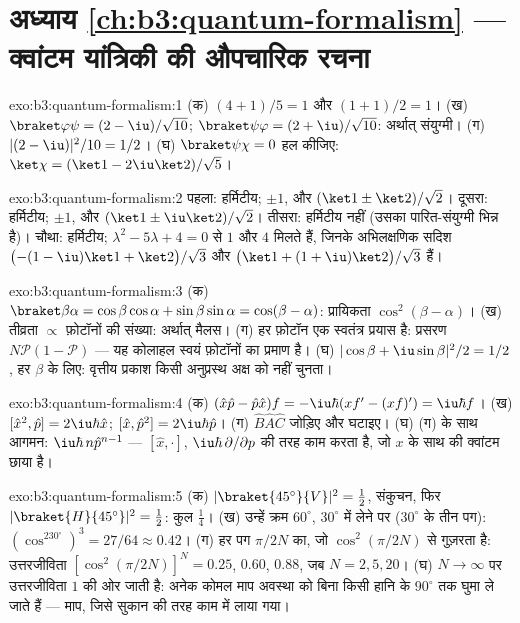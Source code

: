 \section*{अध्याय \ref{ch:b3:quantum-formalism} --- क्वांटम यांत्रिकी की औपचारिक रचना}

\begin{solution}{exo:b3:quantum-formalism:1}
(क) $(4 + 1)/5 = 1$ और $(1 + 1)/2 = 1$। (ख) $\braket\varphi\psi =
(2 - \iu)/\sqrt{10}$; $\braket\psi\varphi = (2 + \iu)/\sqrt{10}$:
अर्थात् संयुग्मी। (ग) $|(2 - \iu)|^2/10 = 1/2$। (घ)
$\braket\psi\chi = 0$ हल कीजिए: $\ket\chi = (\ket1 - 2\iu\ket2)/\sqrt5$।
\end{solution}

\begin{solution}{exo:b3:quantum-formalism:2}
पहला: हर्मिटीय; $\pm1$, और $(\ket1 \pm \ket2)/\sqrt2$। दूसरा:
हर्मिटीय; $\pm1$, और $(\ket1 \pm \iu\ket2)/\sqrt2$। तीसरा: हर्मिटीय
नहीं (उसका पारित-संयुग्मी भिन्न है)। चौथा: हर्मिटीय;
$\lambda^2 - 5\lambda + 4 = 0$ से $1$ और $4$ मिलते हैं, जिनके
अभिलक्षणिक सदिश $\big({-(1 - \iu)}\ket1 + \ket2\big)/\sqrt3$ और $\big(\ket1 +
(1 + \iu)\ket2\big)/\sqrt3$ हैं।
\end{solution}

\begin{solution}{exo:b3:quantum-formalism:3}
(क) $\braket\beta\alpha = \cos\beta\cos\alpha + \sin\beta\sin\alpha
= \cos(\beta - \alpha)$: प्रायिकता $\cos^2(\beta - \alpha)$। (ख)
तीव्रता $\propto$ फ़ोटॉनों की संख्या: अर्थात् मैलस। (ग) हर फ़ोटॉन एक
स्वतंत्र प्रयास है: प्रसरण $N\mathcal P(1 - \mathcal P)$ --- यह
कोलाहल स्वयं फ़ोटॉनों का प्रमाण है। (घ) $|\cos\beta + \iu\sin\beta|^2/2
= 1/2$, हर $\beta$ के लिए: वृत्तीय प्रकाश किसी अनुप्रस्थ
अक्ष को नहीं चुनता।
\end{solution}

\begin{solution}{exo:b3:quantum-formalism:4}
(क) $(\hat x\hat p - \hat p\hat x)f = -\iu\hbar(xf' - (xf)') =
\iu\hbar f$। (ख) $[\hat x^2, \hat p] = 2\iu\hbar\hat x$; $[\hat x,
\hat p^2] = 2\iu\hbar\hat p$। (ग) $\hat B\hat A
\hat C$ जोड़िए और घटाइए। (घ) (ग) के साथ आगमन: $\iu\hbar\,n\hat p^{n-1}$ ---
$[\hat x, \cdot]$, $\iu\hbar\,\partial/\partial p$ की तरह काम करता है,
जो $x$ के साथ  की क्वांटम छाया है।
\end{solution}

\begin{solution}{exo:b3:quantum-formalism:5}
(क) $|\braket{45^\circ}{V}|^2 = \tfrac12$, संकुचन, फिर
$|\braket{H}{45^\circ}|^2 = \tfrac12$: कुल $\tfrac14$। (ख) उन्हें
क्रम $60^\circ$, $30^\circ$ में लेने पर ($30^\circ$ के तीन पग):
$(\cos^230^\circ)^3 = 27/64 \approx 0.42$। (ग) हर पग
$\pi/2N$ का, जो $\cos^2(\pi/2N)$ से गुज़रता है: उत्तरजीविता $[\cos^2(\pi/2N)]^N
= 0.25$, $0.60$, $0.88$, जब $N = 2, 5, 20$। (घ) $N \to \infty$ पर
उत्तरजीविता $1$ की ओर जाती है: अनेक कोमल माप अवस्था को बिना किसी हानि
के $90^\circ$ तक घुमा ले जाते हैं --- माप, जिसे सुकान की तरह काम में
लाया गया।
\end{solution}

